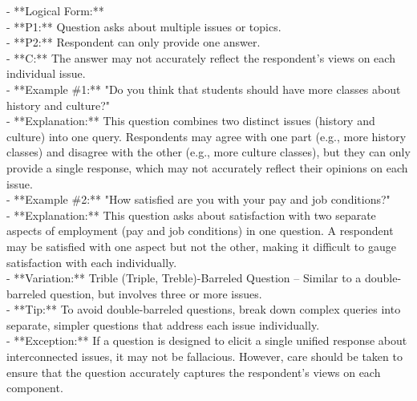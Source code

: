 \documentclass[a4paper,12pt,single,pdftex]{scrartcl}
\begin{document}
    
      - **Logical Form:**
    \\

    
        - **P1:** Question asks about multiple issues or topics.
    \\

    
        - **P2:** Respondent can only provide one answer.
    \\

    
        - **C:** The answer may not accurately reflect the respondent's views on each individual issue.
    \\

    
      - **Example \#1:** "Do you think that students should have more classes about history and culture?"
    \\

    
      - **Explanation:** This question combines two distinct issues (history and culture) into one query. Respondents may agree with one part (e.g., more history classes) and disagree with the other (e.g., more culture classes), but they can only provide a single response, which may not accurately reflect their opinions on each issue.
    \\

    
      - **Example \#2:** "How satisfied are you with your pay and job conditions?"
    \\

    
      - **Explanation:** This question asks about satisfaction with two separate aspects of employment (pay and job conditions) in one question. A respondent may be satisfied with one aspect but not the other, making it difficult to gauge satisfaction with each individually.
    \\

    
      - **Variation:** Trible (Triple, Treble)-Barreled Question – Similar to a double-barreled question, but involves three or more issues.
    \\

    
      - **Tip:** To avoid double-barreled questions, break down complex queries into separate, simpler questions that address each issue individually.
    \\

    
      - **Exception:** If a question is designed to elicit a single unified response about interconnected issues, it may not be fallacious. However, care should be taken to ensure that the question accurately captures the respondent's views on each component.
    \\
\end{document}
